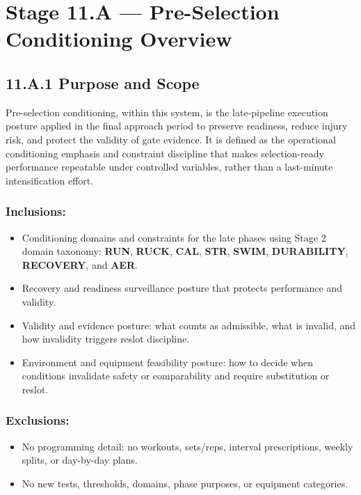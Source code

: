 \documentclass[10pt]{article}
\begin{document}
\section*{Stage 11.A — Pre-Selection Conditioning Overview}
{}

\subsection*{11.A.1 Purpose and Scope}
{}

Pre-selection conditioning, within this system, is the late-pipeline execution posture applied in the final approach period to preserve readiness, reduce injury risk, and protect the validity of gate evidence. It is defined as the operational conditioning emphasis and constraint discipline that makes selection-ready performance repeatable under controlled variables, rather than a last-minute intensification effort.

\subsubsection*{Inclusions:}

\begin{itemize}
\item Conditioning domains and constraints for the late phases using Stage 2 domain taxonomy: \textbf{RUN}, \textbf{RUCK}, \textbf{CAL}, \textbf{STR}, \textbf{SWIM}, \textbf{DURABILITY}, \textbf{RECOVERY}, and \textbf{AER}.
\item Recovery and readiness surveillance posture that protects performance and validity.
\item Validity and evidence posture: what counts as admissible, what is invalid, and how invalidity triggers reslot discipline.
\item Environment and equipment feasibility posture: how to decide when conditions invalidate safety or comparability and require substitution or reslot.
\end{itemize}

\subsubsection*{Exclusions:}

\begin{itemize}
\item No programming detail: no workouts, sets/reps, interval prescriptions, weekly splits, or day-by-day plans.
\item No new tests, thresholds, domains, phase purposes, or equipment categories.
\end{itemize}
\end{document}
